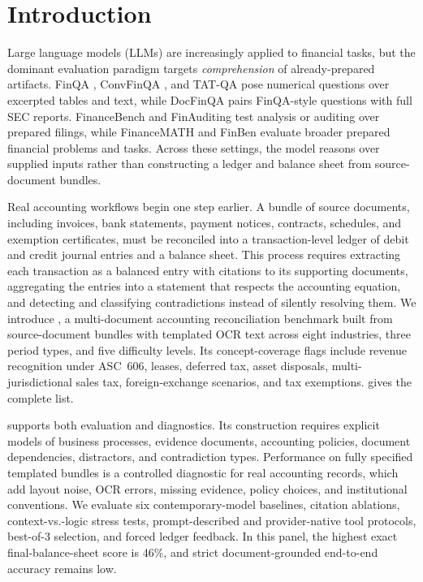 \section{Introduction}
\label{sec:intro}

Large language models (LLMs) are increasingly applied to financial tasks, but the dominant evaluation paradigm targets \emph{comprehension} of already-prepared artifacts. FinQA \citep{chen-etal-2021-finqa}, ConvFinQA \citep{chen-etal-2022-convfinqa}, and TAT-QA \citep{zhu-etal-2021-tatqa} pose numerical questions over excerpted tables and text, while DocFinQA \citep{reddy-etal-2024-docfinqa} pairs FinQA-style questions with full SEC reports. FinanceBench \citep{islam2023financebench} and FinAuditing \citep{wang2026finauditing} test analysis or auditing over prepared filings, while FinanceMATH \citep{zhao-etal-2024-financemath} and FinBen \citep{xie2024finben} evaluate broader prepared financial problems and tasks. Across these settings, the model reasons over supplied inputs rather than constructing a ledger and balance sheet from source-document bundles.



Real accounting workflows begin one step earlier. A bundle of source documents, including invoices, bank statements, payment notices, contracts, schedules, and exemption certificates, must be reconciled into a transaction-level ledger of debit and credit journal entries and a balance sheet. This process requires extracting each transaction as a balanced entry with citations to its supporting documents, aggregating the entries into a statement that respects the accounting equation, and detecting and classifying contradictions instead of silently resolving them. We introduce \benchmark{}, a multi-document accounting reconciliation benchmark built from source-document bundles with templated OCR text across eight industries, three period types, and five difficulty levels. Its concept-coverage flags include revenue recognition under ASC~606, leases, deferred tax, asset disposals, multi-jurisdictional sales tax, foreign-exchange scenarios, and tax exemptions.  gives the complete list.

\benchmark{} supports both evaluation and diagnostics. Its construction requires explicit models of business processes, evidence documents, accounting policies, document dependencies, distractors, and contradiction types. Performance on fully specified templated bundles is a controlled diagnostic for real accounting records, which add layout noise, OCR errors, missing evidence, policy choices, and institutional conventions. We evaluate six contemporary-model baselines, citation ablations, context-vs.-logic stress tests, prompt-described and provider-native tool protocols, best-of-3 selection, and forced ledger feedback. In this panel, the highest exact final-balance-sheet score is 46\%, and strict document-grounded end-to-end accuracy remains low.

